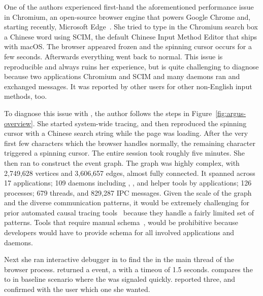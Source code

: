 One of the authors experienced first-hand the aforementioned performance issue
in Chromium, an open-source browser engine that powers Google Chrome and,
starting recently, Microsoft Edge~\cite{chromiumurl}. She tried to type in the
Chromium search box a Chinese word using SCIM, the default Chinese Input Method
Editor that ships with macOS. The browser appeared frozen and the spinning
cursor occurs for a few seconds. Afterwards everything went back to normal.
This issue is reproducible and always ruins her experience, but is quite
challenging to diagnose because two applications Chromium and SCIM and many
daemons ran and exchanged messages. It was reported by other users for
other non-English input methods, too.


To diagnose this issue with \xxx, the author follows the steps in
Figure~\ref{fig:argus-overview}. She started system-wide tracing, and then
reproduced the spinning cursor with a Chinese search string while the page was
loading. After the very first few characters which the browser handles normally,
the remaining character triggered a spinning cursor. The entire session took roughly
five minutes.
She then ran \xxx to construct the event graph. The graph was highly complex,
with 2,749,628 vertices and 3,606,657 edges, almost fully connected. It spanned
across 17 applications; 109 daemons including , ,
 and helper tools by applications; 126 processes; 679
threads, and 829,287 IPC messages. Given the scale of the graph and the diverse
communication patterns, it would be extremely challenging for prior automated
causal tracing tools~\cite{aguilera2003performance, zhang2013panappticon,
attariyan2012x, cohen2004correlating} because they handle a fairly limited
set of patterns. Tools that require manual schema~\cite{barham2004using,
reynolds2006pip}, would be prohibitive because developers would have to provide
schema for all involved applications and daemons.

Next she ran interactive debugger in \xxx to find the \spinningnode in the main
thread of the browser process. \xxx returned a  event, a 
with a timeou of 1.5 seconds.  
\xxx
compares the \spinningnode to \similarnode in baseline scenario where the 
was signaled quickly. \xxx reported three, and confirmed with the user which one
she wanted.


